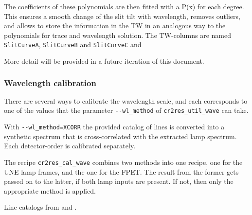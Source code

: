 The coefficients of these polynomials are then fitted with a P(x) for each
degree. This ensures a smooth change of the slit tilt with wavelength, removes
outliers, and allows to store the information in the TW in an analogous way to
the polynomials for trace and wavelength solution. The TW-columns are named \verb!SlitCurveA!, \verb!SlitCurveB! and \verb!SlitCurveC! and 

More detail will be provided in a future iteration of this document.

\subsubsection{Wavelength calibration}

There are several ways to calibrate the wavelength scale, and each corresponds
to one of the values that the parameter \texttt{-{}-wl\_method} of
\texttt{cr2res\_util\_wave} can take.

With \texttt{-{}-wl\_method=XCORR} the provided catalog of lines is converted
into a synthetic spectrum that is cross-correlated with the extracted lamp
spectrum. Each detector-order is calibrated separately.

The recipe \texttt{cr2res\_cal\_wave} combines two methods into one recipe, one
for the UNE lamp frames, and the one for the FPET. The result from the former
gets passed on to the latter, if both lamp inputs are present. If not, then only
the appropriate method is applied.

Line catalogs from \cite{2018A&A...618A.118S} and \cite{2011ApJS..195...24R}.